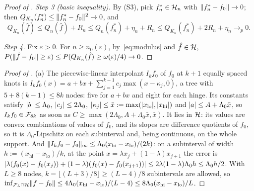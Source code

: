\begin{proof}[Proof of ]
\emph{Step 3 (basic inequality).} By (S3), pick $f_n^* \in \mathcal{H}_n$ with $\lVert f_n^* - f_0\rVert \to 0$; then $Q_{K_n}(f_n^*) \le \lVert f_n^* - f_0\rVert^2 \to 0$, and
\[
Q_{K_n}(\hat f) \le Q_n(\hat f) + R_n \le Q_n(f_n^*) + \eta_n + R_n \le Q_{K_n}(f_n^*) + 2R_n + \eta_n \to_p 0.
\]

\emph{Step 4.} Fix $\varepsilon > 0$. For $n \ge n_0(\varepsilon)$, by~\eqref{eq:modulus} and $\hat f \in \mathcal{H}$, $P(\lVert \hat f - f_0\rVert \ge \varepsilon) \le P(Q_{K_n}(\hat f) \ge \omega(\varepsilon)/4) \to 0$.
\end{proof}

\begin{proof}[Proof of ]
(a) The piecewise-linear interpolant $I_kf_0$ of $f_0$ at $k + 1$ equally spaced knots is $I_kf_0(x) = a + bx + \sum_{j=1}^{k-1}c_j\max(x - \kappa_j, 0)$, a tree with $5 + 8(k - 1) \le 8k$ nodes: five for $a + bx$ and eight for each hinge. Its constants satisfy $\lvert b\rvert \le \Lambda_0$, $\lvert c_j\rvert \le 2\Lambda_0$, $\lvert \kappa_j\rvert \le \bar x := \max(\lvert x_{\mathrm{lo}}\rvert, \lvert x_{\mathrm{hi}}\rvert)$ and $\lvert a\rvert \le A + \Lambda_0\bar x$, so $I_kf_0 \in \mathcal{F}_{8k}$ as soon as $C \ge \max(2\Lambda_0, A + \Lambda_0\bar x, \bar x)$. It lies in $\mathcal{H}$: its values are convex combinations of values of $f_0$, and its slopes are difference quotients of $f_0$, so it is $\Lambda_0$-Lipschitz on each subinterval and, being continuous, on the whole support. And $\lVert I_kf_0 - f_0\rVert_\infty \le \Lambda_0(x_{\mathrm{hi}} - x_{\mathrm{lo}})/(2k)$: on a subinterval of width $h := (x_{\mathrm{hi}} - x_{\mathrm{lo}})/k$, at the point $x = \lambda x_j + (1 - \lambda)x_{j+1}$ the error is $\lvert \lambda(f_0(x) - f_0(x_j)) + (1 - \lambda)(f_0(x) - f_0(x_{j+1}))\rvert \le 2\lambda(1 - \lambda)\Lambda_0h \le \Lambda_0h/2$. With $L \ge 8$ nodes, $k = \lfloor(L + 3)/8\rfloor \ge (L - 4)/8$ subintervals are allowed, so $\inf_{\mathcal{F}_L \cap \mathcal{H}}\lVert f - f_0\rVert \le 4\Lambda_0(x_{\mathrm{hi}} - x_{\mathrm{lo}})/(L - 4) \le 8\Lambda_0(x_{\mathrm{hi}} - x_{\mathrm{lo}})/L$.


\end{proof}
